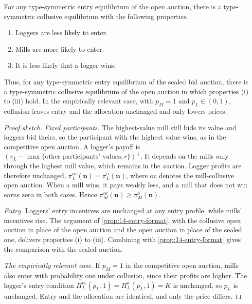 \begin{proposition}\label{prop:14-collusion-open}
For any type-symmetric entry equilibrium of the open auction, there is a type-symmetric collusive
equilibrium with the following properties.
\begin{enumerate}[label=(\roman*)]
\item Loggers are less likely to enter.
\item Mills are more likely to enter.
\item It is less likely that a logger wins.
\end{enumerate}
Thus, for any type-symmetric entry equilibrium of the sealed bid auction, there is a type-symmetric
collusive equilibrium of the open auction in which properties (i) to (iii) hold. In the empirically
relevant case, with $p_M=1$ and $p_L\in(0,1)$, collusion leaves entry and the allocation unchanged and
only lowers prices.
\end{proposition}

\begin{proof}[Proof sketch]
\emph{Fixed participants.} The highest-value mill still bids its value and loggers bid theirs, so the
participant with the highest value wins, as in the competitive open auction. A logger's payoff is
$(v_L-\max\{\text{other participants' values},r\})^+$. It depends on the mills only through the
highest mill value, which remains in the auction. Logger profits are therefore unchanged,
$\pi_L^{\mathrm{oc}}(\bm n)=\pi_L^{\mathrm{o}}(\bm n)$, where oc denotes the mill-collusive open
auction. When a mill wins, it pays weakly less, and a mill that does not win earns zero in both cases.
Hence $\pi_M^{\mathrm{oc}}(\bm n)\ge\pi_M^{\mathrm{o}}(\bm n)$.

\emph{Entry.} Loggers' entry incentives are unchanged at any entry profile, while mills' incentives
rise. The argument of \cref{prop:14-entry-format}, with the collusive open auction in place of the
open auction and the open auction in place of the sealed one, delivers properties (i) to (iii).
Combining with
\cref{prop:14-entry-format} gives the comparison with the sealed auction.

\emph{The empirically relevant case.} If $p_M=1$ in the competitive open auction, mills also enter
with probability one under collusion, since their profits are higher. The logger's entry condition
$\Pi_L^{\mathrm{oc}}(p_L,1)=\Pi_L^{\mathrm{o}}(p_L,1)=K$ is unchanged, so $p_L$ is unchanged.
Entry and the allocation are identical, and only the price differs.
\end{proof}

